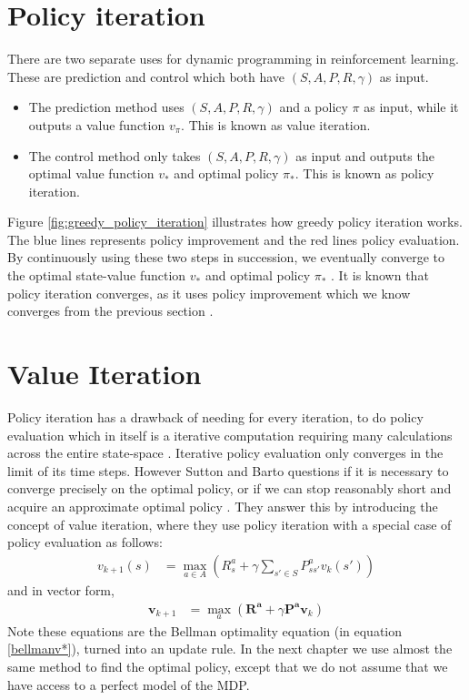 \section{Policy iteration}
There are two separate uses for dynamic programming in reinforcement learning. These are prediction and control which both have $(S,A,P,R,\gamma)$ as input.
\begin{itemize}
	\item The prediction method uses $(S,A,P,R,\gamma)$ and a policy $\pi$ as input, while it outputs a value function $v_\pi$. This is known as value iteration.
	\item The control method only takes $(S,A,P,R,\gamma)$ as input and outputs the optimal value function $v_*$ and optimal policy $\pi_{*}$. This is known as policy iteration.
\end{itemize}
Figure \ref{fig:greedy_policy_iteration} illustrates how greedy policy iteration works. The blue lines represents policy improvement and the red lines policy evaluation. By continuously using these two steps in succession, we eventually converge to the optimal state-value function $v_*$ and optimal policy $\pi_*$ \cite{sutton_barto}. It is known that policy iteration converges, as it uses policy improvement which we know converges from the previous section \cite{sutton_barto}.

\section{Value Iteration}
Policy iteration has a drawback of needing for every iteration, to do policy evaluation which in itself is a iterative computation requiring many calculations across the entire state-space \cite{sutton_barto}. Iterative policy evaluation only converges in the limit of its time steps. However Sutton and Barto questions if it is necessary to converge precisely on the optimal policy, or if we can stop reasonably short and acquire an approximate optimal policy \cite{sutton_barto}. They answer this by introducing the concept of value iteration, where they use policy iteration with a special case of policy evaluation as follows:
\begin{align}
	v_{k+1}(s) &= \max\limits_{a \in A}(R_s^a + \gamma\sum_{s' \in S}P_{ss'}^{a}v_k(s')) 
	\label{eq:value_iteration_summation}
\end{align}
and in vector form,
\begin{align}
	\boldsymbol{v}_{k+1} &= \max\limits_{a}(\boldsymbol{R^a} + \gamma \boldsymbol{P^a} \boldsymbol{v}_k )
	\label{eq:value_iteration_vector}
\end{align}
Note these equations are the Bellman optimality equation (in equation \ref{bellmanv*}), turned into an update rule.
In the next chapter we use almost the same method to find the optimal policy, except that we do not assume that we have access to a perfect model of the MDP.
